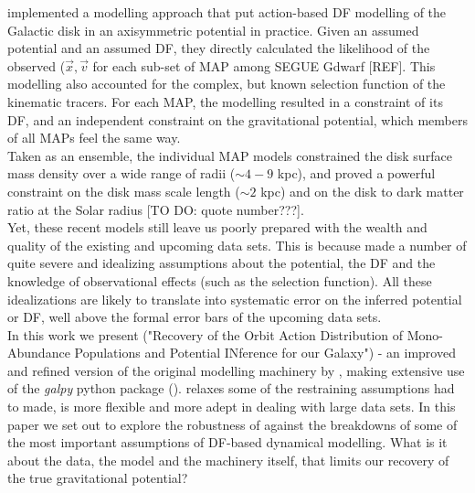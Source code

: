 \cite{bov13} implemented a modelling approach that put action-based DF modelling of the Galactic disk in an axisymmetric potential in practice. Given an assumed potential and an assumed DF, they directly calculated the likelihood of the observed ($\vec{x},\vec{v}$ for each sub-set of MAP among SEGUE Gdwarf [REF]. This modelling also accounted for the complex, but known selection function of the kinematic tracers.  For each MAP, the modelling resulted in a constraint of its DF, and an independent constraint on the gravitational potential, which members of all MAPs feel the same way. \\
Taken as an ensemble, the individual MAP models constrained the disk surface mass density over a wide range of radii ($\sim 4-9$ kpc), and proved a powerful constraint on the disk mass scale length ($\sim 2$ kpc) and on the disk to dark matter ratio at the Solar radius [TO DO: quote number???]. \\

Yet, these recent models still leave us poorly prepared with the wealth and quality of the existing and upcoming data sets. This is because \cite{bov13} made a number of quite severe and idealizing assumptions about the potential, the DF and the knowledge of observational effects (such as the selection function). All these idealizations are likely to translate into systematic error on the inferred potential or DF, well above the formal error bars of the upcoming data sets. \\

In this work we present \RM ("Recovery of the Orbit Action Distribution of Mono-Abundance Populations and Potential INference for our Galaxy") - an improved and refined version of the original modelling machinery by \cite{bov13}, making extensive use of the \emph{galpy} python package (\cite{bov15}). \RM relaxes some of the restraining assumptions \cite{bov13} had to made, is more flexible and more adept in dealing with large data sets. In this paper we set out to explore the robustness of \RM against the breakdowns of some of the most important assumptions of DF-based dynamical modelling. What is it about the data, the model and the machinery itself, that limits our recovery of the true gravitational potential? \\

